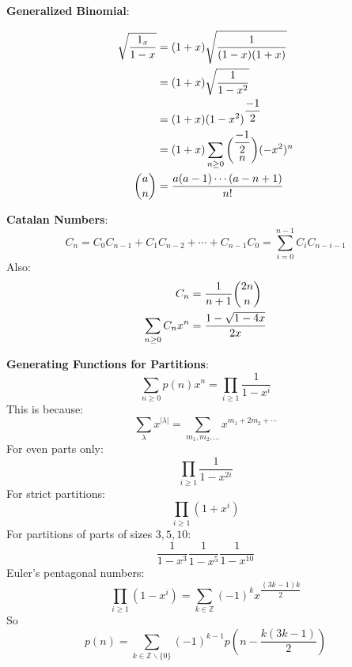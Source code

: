 \documentclass{report}
\begin{document}
\textbf{Generalized Binomial}:
\begin{examples}
    \begin{example}
        \begin{align*}
            \sqrt{\dfrac{1 _ x}{1 - x}} &= (1 + x)\sqrt{\dfrac{1}{(1 - x)(1 + x)}}                      \\
                                        &= (1 + x) \sqrt{\dfrac{1}{1 - x^{2}}}                          \\
                                        &= (1 + x)(1 - x^{2})^{\dfrac{-1}{2}}                           \\
                                        &= (1 + x) \sum_{n \geq0} \dbinom{\dfrac{-1}{2}}{n}(-x^{2})^{n} \\
            \dbinom{a}{n}               &= \dfrac{a(a - 1) \cdots (a - n + 1)}{n!}                        
        \end{align*}
    \end{example}
\end{examples}

\textbf{Catalan Numbers}: 
    \begin{equation*}
        C_{n} = C_{0} C_{n - 1} + C_{1}C_{n - 2} + \cdots + C_{n - 1}C_{0} = \sum_{i = 0}^{n - 1}C_{i}C_{n - i - 1}
    \end{equation*}
Also:
    \begin{align*}
        C_{n}                    &= \dfrac{1}{n + 1}\dbinom{2n}{n} \\
        \sum_{n \geq0}C_{n}x^{n} &= \dfrac{1 - \sqrt{1 - 4x}}{2x}    
    \end{align*}

\textbf{Generating Functions for Partitions}:
    \begin{equation*}
        \sum_{n \geq 0} p(n)x^{n} = \prod_{i \geq 1} \dfrac{1}{1 - x^{i}}
    \end{equation*}
This is because:
    \begin{equation*}
        \sum_{\lambda}x^{\lvert \lambda \rvert} = \sum_{m_{1}, m_{2}, \ldots}x^{m_{1} + 2m_{2} + \cdots}
    \end{equation*}
For even parts only:
    \begin{equation*}
        \prod_{i \geq 1}\dfrac{1}{1 - x^{2i}}
    \end{equation*}
For strict partitions:
    \begin{equation*}
        \prod_{i \geq 1}(1 + x^{i})
    \end{equation*}
For partitions of parts of sizes $3, 5, 10$:
    \begin{equation*}
        \dfrac{1}{1 - x^{3}}\dfrac{1}{1 - x^{5}} \dfrac{1}{1 - x^{10}}
    \end{equation*}
Euler's pentagonal numbers:
    \begin{equation*}
        \prod_{i \geq 1}(1 - x^{i}) = \sum_{ k \in \mathbb{Z}}(-1)^{k}x^{\dfrac{(3k - 1)k}{2}}
    \end{equation*}
So
    \begin{equation*}
        p(n) = \sum_{ k \in \mathbb{Z} \backslash \{0\}}(-1)^{k - 1}p(n - \dfrac{k(3k - 1)}{2}) 
    \end{equation*}
\end{document}
